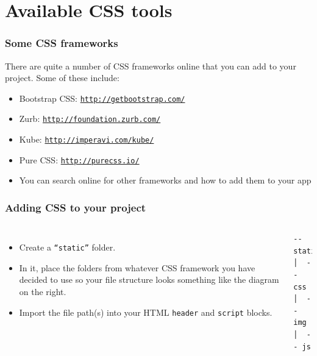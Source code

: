 \documentclass[10pt,t,xcolor=dvipsnames]{beamer}
\begin{document}
\section{Available CSS tools}
\begin{frame}[fragile]
\frametitle{Some CSS frameworks}
\pause
There are quite a number of CSS frameworks online that you can add to your project. Some of these include:
\begin{itemize}[<+->]
\item Bootstrap CSS: \texttt{\href{bootstrap_link}{http://getbootstrap.com/}}
\item Zurb: \texttt{\href{zurb_link}{http://foundation.zurb.com/}}
\item Kube: \texttt{\href{kube_link}{http://imperavi.com/kube/}}
\item Pure CSS: \texttt{\href{pure_link}{http://purecss.io/}}
\item You can search online for other frameworks and how to add them to your app
\end{itemize}
\end{frame}
\begin{frame}[fragile]
\frametitle{Adding CSS to your project}
\pause
\begin{columns}[l]
\begin{itemize}[<+->]
\item Create a \texttt{``static''} folder.
\item In it, place the folders from whatever CSS framework you have decided to use so your file structure looks something like the diagram on the right.
\item Import the file path(s) into your HTML \texttt{header} and \texttt{script} blocks.
\end{itemize}
\begin{lstlisting}
-- static
│  -- css
│  -- img
│  -- js
\end{lstlisting}
\end{columns}
\end{frame}
\end{document}

